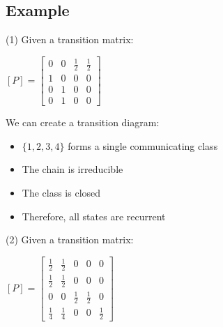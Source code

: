 \documentclass[12pt]{article}
\begin{document}
\subsection*{Example}
(1) Given a transition matrix:
\begin{center}
    $[P] = 
    \begin{bmatrix}
        0&0&\frac{1}{2}&\frac{1}{2}\\
        1&0&0&0\\
        0&1&0&0\\
        0&1&0&0
    \end{bmatrix}$
\end{center}
We can create a transition diagram:
\begin{center}
\end{center}
\begin{itemize}
    \item $\{1,2,3,4\}$ forms a single communicating class
    \item The chain is irreducible 
    \item The class is closed
    \item Therefore, all states are recurrent
\end{itemize}
\newpage
(2) Given a transition matrix:
\begin{center}
    $[P] = 
    \begin{bmatrix}
        \frac{1}{2}&\frac{1}{2}&0&0&0\\
        \frac{1}{2}&\frac{1}{2}&0&0&0\\
        0&0&\frac{1}{2}&\frac{1}{2}&0\\
        \frac{1}{4}&\frac{1}{4}&0&0&\frac{1}{2}
    \end{bmatrix}$
\end{center}
\end{document}
